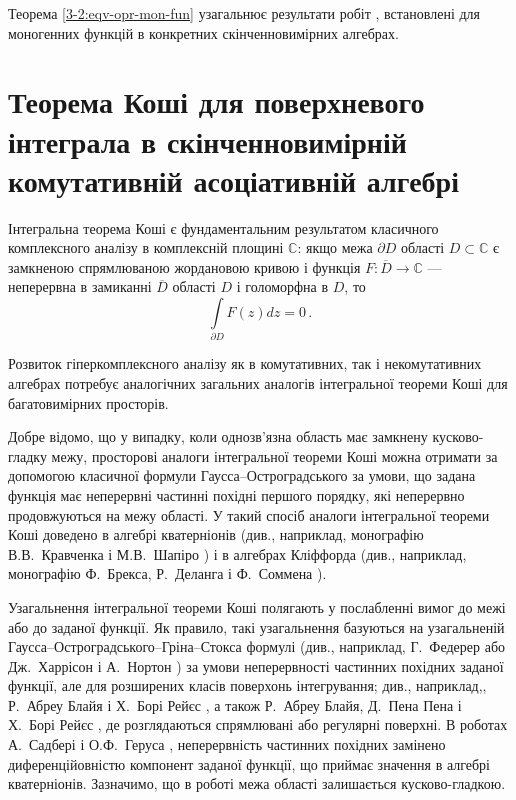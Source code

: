 \documentclass[11pt, reqno]{amsart}
\begin{document}
Теорема \ref{3-2:eqv-opr-mon-fun} узагальнює результати робіт
\cite{Pl-Shp1,Pl-Shp2,Pl-Shp3,Plaksa12,PlPu13,Pl-Shp-Al,Pukh-5},
встановлені для моногенних функцій в конкретних скінченновимірних алгебрах.




\section{Теорема Коші для поверхневого інтеграла в скінченновимірній комутативній асоціативній алгебрі}


Інтегральна теорема Коші є фундаментальним результатом класичного
комплексного аналізу в комплексній площині $\mathbb{C}$:
якщо межа $\partial D$ області $D\subset\mathbb{C}$ є замкненою спрямлюваною жордановою кривою
і функція $F\colon \overline{D}\longrightarrow \mathbb{C}$ --- неперервна в замиканні $\overline{D}$ області $D$ 
і голоморфна в $D$, то
$$\int\limits_{\partial D}F(z)dz=0\,.$$


Розвиток гіперкомплексного аналізу як в комутативних, так і
некомутативних алгебрах потребує аналогічних загальних аналогів
інтегральної теореми Коші для багатовимірних просторів.


Добре відомо, що у випадку, коли однозв'язна область
має замкнену кусково-гладку межу, просторові аналоги інтегральної теореми Коші
можна отримати за допомогою класичної формули Гаусса--Остроградського  за умови,
що задана функція має неперервні частинні похідні першого порядку, які неперервно продовжуються на
межу області. У такий спосіб аналоги інтегральної теореми Коші
доведено в алгебрі кватерніонів (див., наприклад, монографію В.В.~Кравченка і М.В.~Шапіро
\cite[с.~66]{Krav-Shap}) і в алгебрах Кліффорда (див., наприклад, монографію
Ф.~Брекса, Р.~Деланга і Ф.~Соммена \cite[с.~52]{Brakx}).

Узагальнення інтегральної теореми Коші полягають у
послабленні вимог до межі або до заданої функції.
Як правило, такі узагальнення базуються на узагальненій Гаусса--Остроградського--Гріна--Стокса
формулі (див., наприклад,  Г.~Федерер \cite{Federer-3-3} або Дж.~Харрісон і А.~Нортон \cite{Harrison-Norton-3-3}) 
за умови неперервності частинних похідних заданої функції, але для розширених класів поверхонь інтегрування; див.,
наприклад,, Р.~Абреу Блайя і Х.~Борі Рейєс \cite{Abreu-Bory-99-3-3}, а також
Р.~Абреу Блайя, Д.~Пена Пена і Х.~Борі Рейєс
\cite{Abreu-Bory-Pena-3-3}, де розглядаються спрямлювані або регулярні поверхні. 
В роботах А.~Садбері \cite{Sudbery} і О.Ф.~Геруса \cite{Gerus-2011}, 
неперервність частинних похідних замінено диференційовністю компонент
заданої функції, що приймає значення в алгебрі кватерніонів. Зазначимо, що в роботі \cite{Gerus-2011}
межа області залишається кусково-гладкою.
\end{document}

